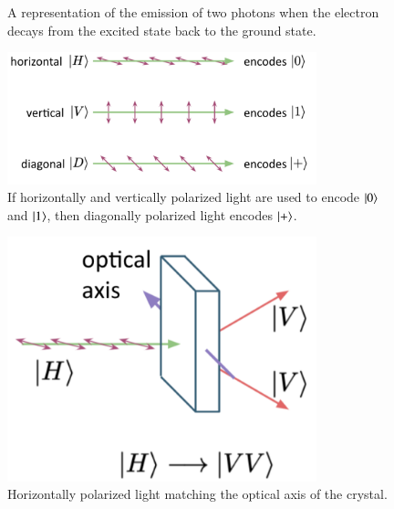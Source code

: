 \begin{figure}[H]
\begin{minipage}[b]{0.3\textwidth}
    \caption{A representation of the emission of two photons when the electron decays from the excited state back to the ground state.}
  \end{minipage}
\end{figure}

\begin{figure}[H]
    \centering
    \includegraphics[width=0.8\textwidth]{lesson4/linear_polarization.pdf}
    
        \caption[Horizontally, vertically and diagonally polarized light]{If horizontally and vertically polarized light are used to encode $\left| 0 \right\rangle$ and $\left| 1 \right\rangle$, then diagonally polarized light encodes $\left| + \right\rangle$.}
    
    \label{fig:hvd-light}
\end{figure}

\begin{figure}[H]
    \centering
    \includegraphics[width=0.8\textwidth]{lesson4/horizontal_optical_axis.pdf}
    
        \caption{Horizontally polarized light matching the optical axis of the crystal.}
    
    \label{fig:horizontal-opt-axis}
\end{figure}

